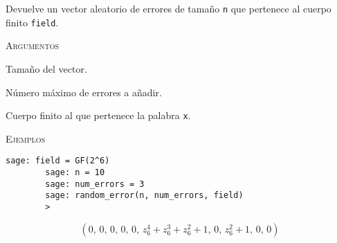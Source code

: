 \begin{description}[leftmargin=1em, font=\normalfont\ttfamily, style=nextline]
    \item[random\_error(n, num\_errors, field)]
  
    Devuelve un vector aleatorio de errores de tamaño \texttt{n} que pertenece al cuerpo finito \texttt{field}.
  
    \textsc{Argumentos}
    \begin{description}[font=\normalfont\ttfamily]
        \item[n] Tamaño del vector.
        \item[num\_errors] Número máximo de errores a añadir.
        \item[field] Cuerpo finito al que pertenece la palabra \texttt{x}.
    \end{description}

    \textsc{Ejemplos}
    \begin{lstlisting}[gobble=4]
        sage: field = GF(2^6)
        sage: n = 10
        sage: num_errors = 3
        sage: random_error(n, num_errors, field)
        > 
    \end{lstlisting}
    \[
        \left(0,\,0,\,0,\,0,\,0,\,z_{6}^{4} + z_{6}^{3} + z_{6}^{2} + 1,\,0,\,z_{6}^{2} + 1,\,0,\,0\right)
    \]
\end{description}